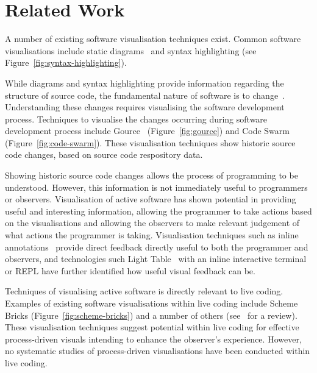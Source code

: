 \section{Related Work}



A number of existing software visualisation techniques exist. Common software visualisations include static diagrams~ and syntax highlighting (see Figure~\ref{fig:syntax-highlighting}). \more

While diagrams and syntax highlighting provide information regarding the structure of source code, the fundamental nature of software is to change~. Understanding these changes requires visualising the software development process. Techniques to visualise the changes occurring during software development process include Gource~\cite{Caudwell2010} (Figure~\ref{fig:gource}) and Code Swarm~\cite{Ogawa2012} (Figure~\ref{fig:code-swarm}). These visualisation techniques show historic source code changes, based on source code respository data.

Showing historic source code changes allows the process of programming to be understood. However, this information is not immediately useful to programmers or observers. Visualisation of active software has shown potential in providing useful and interesting information, allowing the programmer to take actions based on the visualisations and allowing the observers to make relevant judgement of what actions the programmer is taking. Visualisation techniques such as inline annotations~\cite{Swift2013} provide direct feedback directly useful to both the programmer and observers, and technologies such Light Table~\cite{Kodowa2014} with an inline interactive terminal or \ac{REPL} have further identified how useful visual feedback can be.

Techniques of visualising active software is directly relevant to live coding. Examples of existing software visualisations within live coding include Scheme Bricks (Figure~\ref{fig:scheme-bricks}) and a number of others (see~\cite{McLean2010a} for a review). These visualisation techniques suggest potential within live coding for effective process-driven visuals intending to enhance the observer's experience. However, no systematic studies of process-driven visualisations have been conducted within live coding.


